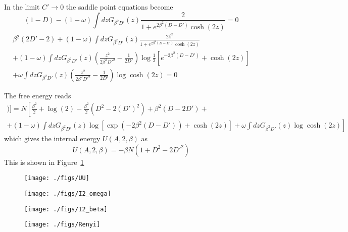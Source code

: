 \documentclass[onecolumn,superscriptaddress,pr]{revtex4}
\begin{document}
In the limit $C'\to 0$ the saddle point equations 
become 
%
\begin{equation}
(1-D)-(1-\omega)\int dz G_{\beta^2 D'}(z)\frac{2}{1
+e^{2\beta^2(D-D')}\cosh(2z)}=0
\end{equation}
%
\begin{multline}
\label{saddle2}
\beta^2(2D'-2)+
(1-\omega)\int dzG_{\beta^2D'}(z)
\frac{2\beta^2}{1+e^{2\beta^2(D-D')}
\cosh(2z)}\\+
(1-\omega)\int dzG_{\beta^2D'}(z)
\left(\frac{z^2}{2\beta^2D'^2}-\frac{1}{2D'}\right)\log\frac{1}{2}\left[e^{-2\beta^2(D-D')}+
\cosh(2z)\right]\\
+\omega\int dz G_{\beta^2D'}(z)\left(\frac{z^2}{2\beta^2D'^2}-\frac{1}{2D'}\right)
\log\cosh(2z)=0
\end{multline}

The free energy reads 
%
\begin{multline}
[\log(Z[A,2,\beta])]=
N\left[\frac{\beta^2}{2}+\log(2)
-\frac{\beta^2}{2}\left(D^2-2(D')^2
\right)+\beta^2(D-2D') 
+\right.\\\left.
+(1-\omega)\int dzG_{\beta^2 D'}(z)\log 
\left[
\exp(-2\beta^2(D-D'))+\cosh(2z)\right]
+\omega\int dzG_{\beta^2 D'}(z)
\log\cosh(2z)
\right]
\end{multline}
%
which gives the internal energy $U(A,2,\beta)$ as 
%
\begin{equation}
U(A,2,\beta)=-\beta N(1+D^2-2D'^2)
\end{equation}
%
This is shown in Figure~\ref{uu}

\begin{figure}[t]
\texttt{[image: ./figs/UU]}
\caption{\label{uu}
}
\end{figure}

\begin{figure}[t]
\texttt{[image: ./figs/I2\_omega]}
\caption{\label{I2_omega}
}
\end{figure}

\begin{figure}[t]
\texttt{[image: ./figs/I2\_beta]}
\caption{\label{I2_beta}
}
\end{figure}

\begin{figure}[t]
\texttt{[image: ./figs/Renyi]}
\caption{\label{renyi}
}
\end{figure}
\end{document}
